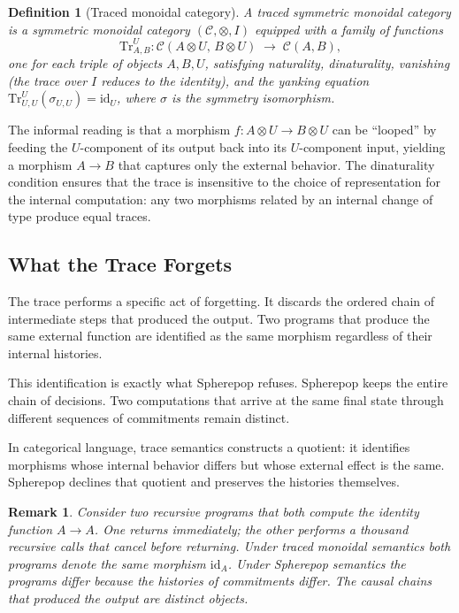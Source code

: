 \documentclass[12pt]{article}
\newtheorem{definition}{Definition}[section]
\newtheorem{remark}{Remark}[section]
\begin{document}
\medskip

\begin{definition}[Traced monoidal category]
A \emph{traced symmetric monoidal category} is a symmetric monoidal category $(\mathcal{C}, \otimes, I)$ equipped with a family of functions
\[
\mathrm{Tr}^U_{A,B} : \mathcal{C}(A \otimes U,\, B \otimes U) \;\longrightarrow\; \mathcal{C}(A, B),
\]
one for each triple of objects $A, B, U$, satisfying naturality, dinaturality, vanishing (the trace over $I$ reduces to the identity), and the yanking equation $\mathrm{Tr}^U_{U,U}(\sigma_{U,U}) = \mathrm{id}_U$, where $\sigma$ is the symmetry isomorphism.
\end{definition}

The informal reading is that a morphism $f : A \otimes U \to B \otimes U$ can be ``looped'' by feeding the $U$-component of its output back into its $U$-component input, yielding a morphism $A \to B$ that captures only the external behavior. The dinaturality condition ensures that the trace is insensitive to the choice of representation for the internal computation: any two morphisms related by an internal change of type produce equal traces.

\subsection{What the Trace Forgets}

The trace performs a specific act of forgetting. It discards the ordered chain of intermediate steps that produced the output. Two programs that produce the same external function are identified as the same morphism regardless of their internal histories.

This identification is exactly what Spherepop refuses. Spherepop keeps the entire chain of decisions. Two computations that arrive at the same final state through different sequences of commitments remain distinct.

In categorical language, trace semantics constructs a quotient: it identifies morphisms whose internal behavior differs but whose external effect is the same. Spherepop declines that quotient and preserves the histories themselves.

\begin{remark}
Consider two recursive programs that both compute the identity function $A \to A$. One returns immediately; the other performs a thousand recursive calls that cancel before returning. Under traced monoidal semantics both programs denote the same morphism $\mathrm{id}_A$. Under Spherepop semantics the programs differ because the histories of commitments differ. The causal chains that produced the output are distinct objects.
\end{remark}
\end{document}
